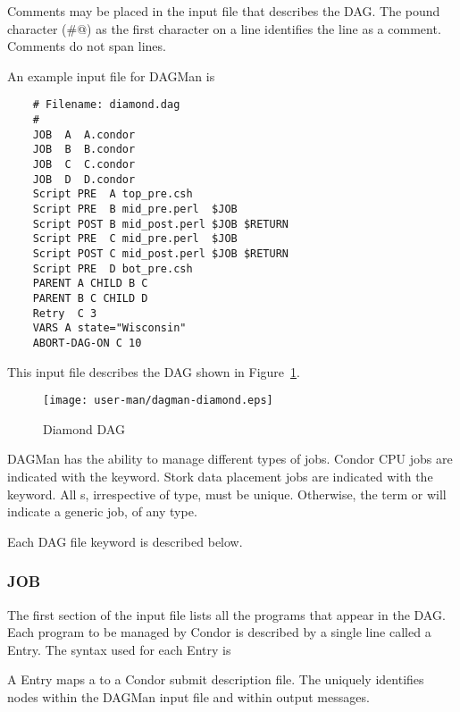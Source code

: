 Comments may be placed in the input file that describes the DAG.
The pound character (\verb@#@) as the first character on a
line identifies the line as a comment.
Comments do not span lines.

An example input file for DAGMan is

\footnotesize
\begin{verbatim}
    # Filename: diamond.dag
    #
    JOB  A  A.condor 
    JOB  B  B.condor 
    JOB  C  C.condor	
    JOB  D  D.condor
    Script PRE  A top_pre.csh
    Script PRE  B mid_pre.perl  $JOB
    Script POST B mid_post.perl $JOB $RETURN
    Script PRE  C mid_pre.perl  $JOB
    Script POST C mid_post.perl $JOB $RETURN
    Script PRE  D bot_pre.csh
    PARENT A CHILD B C
    PARENT B C CHILD D
    Retry  C 3
    VARS A state="Wisconsin"
    ABORT-DAG-ON C 10
\end{verbatim}
\normalsize

This input file describes the DAG shown in 
Figure~\ref{fig:dagman-diamond}.

\begin{figure}[hbt]
\centering
\texttt{[image: user-man/dagman-diamond.eps]}
\caption{\label{fig:dagman-diamond}Diamond DAG}
\end{figure}

DAGMan has the ability to manage different types of jobs.  Condor CPU
jobs are indicated with the  keyword.  Stork data placement
jobs are indicated with the  keyword.  All s,
irrespective of type, must be unique.  Otherwise, the term 
or  will indicate a generic job, of any type.

Each DAG file keyword is described below.

\subsubsection{\label{dagman:JOB}JOB}

The first section of the input file lists
all the programs that appear in the DAG.
Each program to be managed by Condor is described by a single line
called a  Entry.
The syntax used for each  Entry is

   

A  Entry maps a  to a Condor submit description file.
The  uniquely identifies nodes within the
DAGMan input file and within output messages.

